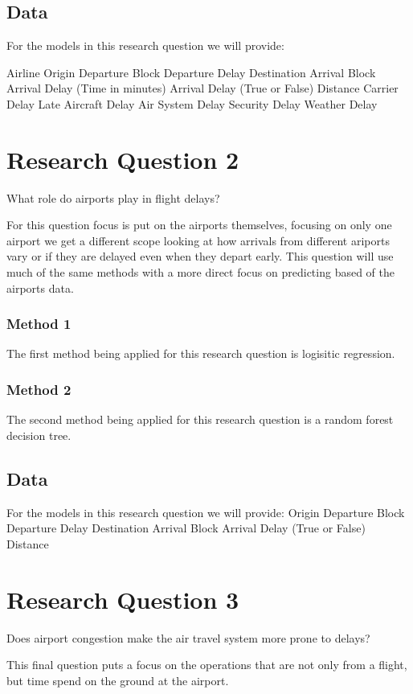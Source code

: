 \documentclass[a4paper,12pt]{article}
\begin{document}
\subsection{Data}
For the models in this research question we will provide:

Airline
Origin
Departure Block
Departure Delay
Destination
Arrival Block
Arrival Delay (Time in minutes)
Arrival Delay (True or False)
Distance 
Carrier Delay
Late Aircraft Delay
Air System Delay
Security Delay
Weather Delay

\section{Research Question 2}
What role do airports play in flight delays?

For this question focus is put on the airports themselves, focusing on only one airport we get a different scope looking at how arrivals from different ariports vary
or if they are delayed even when they depart early. This question will use much of the same methods with a more direct focus on predicting based of the airports data.

\subsubsection{Method 1}
The first method being applied for this research question is logisitic regression.

\subsubsection{Method 2}
The second method being applied for this research question is a random forest decision tree.

\subsection{Data}
For the models in this research question we will provide:
Origin
Departure Block
Departure Delay
Destination
Arrival Block
Arrival Delay (True or False)
Distance


\section{Research Question 3}
Does airport congestion make the air travel system more prone to delays?

This final question puts a focus on the operations that are not only from a flight, but time spend on the ground at the airport.
\end{document}
